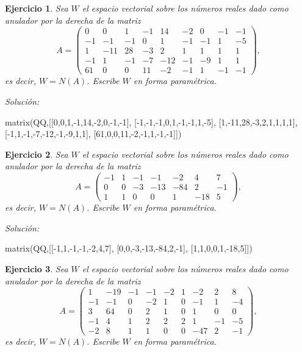 \documentclass{amsart}
\newtheorem{ejer}{Ejercicio}
\begin{document}
\begin{ejer} Sea $W$ el espacio vectorial sobre los números reales dado
como anulador por la derecha de la matriz 
\[A = \left(\begin{array}{rrrrrrrrr}
0 & 0 & 1 & -1 & 14 & -2 & 0 & -1 & -1 \\
-1 & -1 & -1 & 0 & 1 & -1 & -1 & 1 & -5 \\
1 & -11 & 28 & -3 & 2 & 1 & 1 & 1 & 1 \\
-1 & 1 & -1 & -7 & -12 & -1 & -9 & 1 & 1 \\
61 & 0 & 0 & 11 & -2 & -1 & 1 & -1 & -1
\end{array}\right),\]
es decir, $W = N(A)$. Escribe $W$ en forma param\'etrica.
\end{ejer}

{\it Soluci\'on:}

\begin{sageblock}
matrix(QQ,[[0,0,1,-1,14,-2,0,-1,-1],
[-1,-1,-1,0,1,-1,-1,1,-5],
[1,-11,28,-3,2,1,1,1,1],
[-1,1,-1,-7,-12,-1,-9,1,1],
[61,0,0,11,-2,-1,1,-1,-1]])
\end{sageblock}



\begin{ejer} Sea $W$ el espacio vectorial sobre los números reales dado
como anulador por la derecha de la matriz 
\[A = \left(\begin{array}{rrrrrrr}
-1 & 1 & -1 & -1 & -2 & 4 & 7 \\
0 & 0 & -3 & -13 & -84 & 2 & -1 \\
1 & 1 & 0 & 0 & 1 & -18 & 5
\end{array}\right),\]
es decir, $W = N(A)$. Escribe $W$ en forma param\'etrica.
\end{ejer}

{\it Soluci\'on:}

\begin{sageblock}
matrix(QQ,[[-1,1,-1,-1,-2,4,7],
[0,0,-3,-13,-84,2,-1],
[1,1,0,0,1,-18,5]])
\end{sageblock}



\begin{ejer} Sea $W$ el espacio vectorial sobre los números reales dado
como anulador por la derecha de la matriz 
\[A = \left(\begin{array}{rrrrrrrrr}
1 & -19 & -1 & -1 & -2 & 1 & -2 & 2 & 8 \\
-1 & -1 & 0 & -2 & 1 & 0 & -1 & 1 & -4 \\
3 & 64 & 0 & 2 & 1 & 0 & 1 & 0 & 0 \\
-1 & 4 & 1 & 2 & 2 & 2 & 1 & -1 & -5 \\
-2 & 8 & 1 & 1 & 0 & 0 & -47 & 2 & -1
\end{array}\right),\]
es decir, $W = N(A)$. Escribe $W$ en forma param\'etrica.
\end{ejer}
\end{document}
